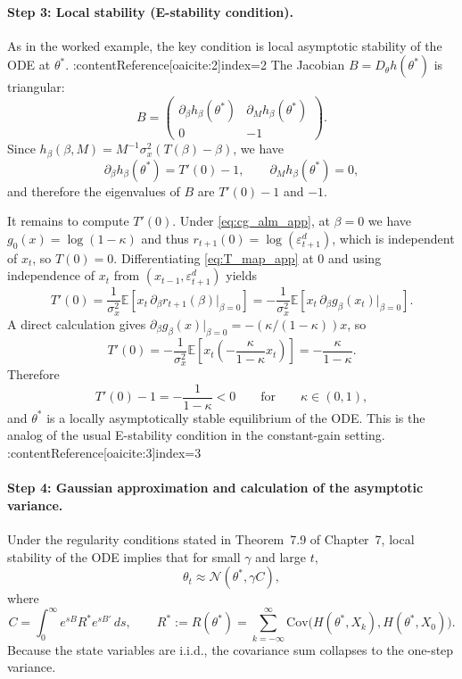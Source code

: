 \documentclass[11pt]{article}
\begin{document}
\paragraph{Step 3: Local stability (E-stability condition).}
As in the worked example, the key condition is local asymptotic stability of the ODE at $\theta^*$. :contentReference[oaicite:2]{index=2}
The Jacobian $B=D_\theta h(\theta^*)$ is triangular:
\[
B=
\begin{pmatrix}
    \partial_\beta h_\beta(\theta^*) & \partial_M h_\beta(\theta^*) \\
    0 & -1
\end{pmatrix}.
\]
Since $h_\beta(\beta,M)=M^{-1}\sigma_x^2(T(\beta)-\beta)$, we have
\[
\partial_\beta h_\beta(\theta^*)=T'(0)-1,
\qquad
\partial_M h_\beta(\theta^*)=0,
\]
and therefore the eigenvalues of $B$ are $T'(0)-1$ and $-1$.

It remains to compute $T'(0)$. Under \eqref{eq:cg_alm_app}, at $\beta=0$ we have $g_0(x)=\log(1-\kappa)$ and thus
$r_{t+1}(0)=\log(\varepsilon^d_{t+1})$, which is independent of $x_t$, so $T(0)=0$.
Differentiating \eqref{eq:T_map_app} at $0$ and using independence of $x_t$ from $(x_{t-1},\varepsilon^d_{t+1})$ yields
\[
T'(0)
=
\frac{1}{\sigma_x^2}\mathbb E\!\left[x_t\,\partial_\beta r_{t+1}(\beta)\big|_{\beta=0}\right]
=
-\frac{1}{\sigma_x^2}\mathbb E\!\left[x_t\,\partial_\beta g_\beta(x_t)\big|_{\beta=0}\right].
\]
A direct calculation gives $\partial_\beta g_\beta(x)\big|_{\beta=0}=-(\kappa/(1-\kappa))x$, so
\begin{equation}\label{eq:Tprime0_app}
T'(0)
=
-\frac{1}{\sigma_x^2}\mathbb E\!\left[x_t\left(-\frac{\kappa}{1-\kappa}x_t\right)\right]
=
-\frac{\kappa}{1-\kappa}.
\end{equation}
Therefore
\[
T'(0)-1=-\frac{1}{1-\kappa}<0
\qquad\text{for}\qquad \kappa\in(0,1),
\]
and $\theta^*$ is a locally asymptotically stable equilibrium of the ODE. This is the analog of the usual E-stability condition in the constant-gain setting. :contentReference[oaicite:3]{index=3}

\paragraph{Step 4: Gaussian approximation and calculation of the asymptotic variance.}
Under the regularity conditions stated in Theorem~7.9 of Chapter~7, local stability of the ODE implies that for small $\gamma$ and large $t$,
\begin{equation}\label{eq:cg_asymptotic_normal}
    \theta_t \approx \mathcal N(\theta^*,\gamma C),
\end{equation}
where
\begin{equation}\label{eq:C_integral_app}
    C=\int_0^\infty e^{sB}R^*e^{sB'}\,ds,
    \qquad
    R^*:=R(\theta^*)=\sum_{k=-\infty}^{\infty}\mathrm{Cov}\!\big(H(\theta^*,X_k),H(\theta^*,X_0)\big).
\end{equation}
Because the state variables are i.i.d., the covariance sum collapses to the one-step variance.
\end{document}
